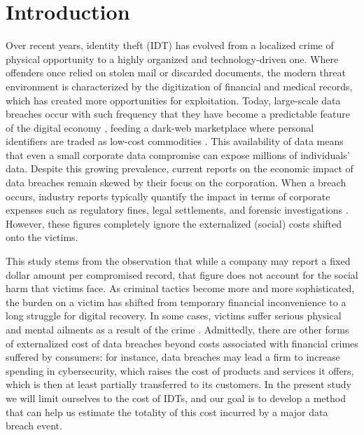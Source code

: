 \section{Introduction}

Over recent years, identity theft (IDT) has evolved from a localized crime of physical opportunity to a highly organized and technology-driven one. Where offenders once relied on stolen mail or discarded documents, the modern threat environment is characterized by the digitization of financial and medical records, which has created more opportunities for exploitation. Today, large-scale data breaches occur with such frequency that they have become a predictable feature of the digital economy \cite{Verizon_DBIR_2025}, feeding a dark-web marketplace where personal identifiers are traded as low-cost commodities \cite{Holt2013}. This availability of data means that even a small corporate data compromise can expose millions of individuals' data. Despite this growing prevalence, current reports on the economic impact of data breaches remain skewed by their focus on the corporation. When a breach occurs, industry reports typically quantify the impact in terms of corporate expenses such as regulatory fines, legal settlements, and forensic investigations \cite{IBM_DBR_2025}. However, these figures completely ignore the externalized (social) costs shifted onto the victims. 

This study stems from the observation that while a company may report a fixed dollar amount per compromised record, that figure does not account for the social harm that victims face. As criminal tactics become more and more sophisticated, the burden on a victim has shifted from temporary financial inconvenience to a long struggle for digital recovery. In some cases, victims suffer serious physical and mental ailments as a result of the crime \cite{Golladay2017Consequences}.
%
Admittedly, there are other forms of externalized cost of data breaches beyond costs associated with financial crimes suffered by consumers: for instance, data breaches may lead a firm to increase spending in cybersecurity, which raises the cost of products and services it offers, which is then at least partially transferred to its customers. In the present study we will limit ourselves to the cost of IDTs, and our goal is to develop a method that can help us estimate the totality of this cost incurred by a major data breach event. 

